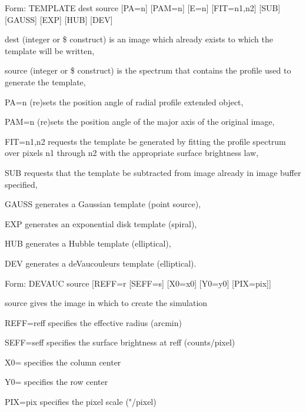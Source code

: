 {\newpage\clearpage
{}%
\begin{command}
  \item[Form: TEMPLATE dest source {[PA=n]} {[PAM=n]} {[E=n]} {[FIT=n1,n2]}
       {[SUB]} {[GAUSS]} {[EXP]} {[HUB]} {[DEV]}\hfill]{}
  \item[dest]{(integer or \$ construct) is an image which already 
       exists to which the template will be written,}
  \item[source]{(integer or \$ construct) is the spectrum that
       contains the profile used to generate the template,}
  \item[PA=n]{(re)sets the position angle of radial profile
       extended object,}
  \item[PAM=n]{(re)sets the position angle of the major axis
       of the original image,}
  \item[FIT=n1,n2]{requests the template be generated by fitting
       the profile spectrum over pixels n1 through n2
       with the appropriate surface brightness law,}
  \item[SUB]{requests that the template be subtracted from
       image already in image buffer specified,}
  \item[GAUSS]{generates a Gaussian template (point source),}
  \item[EXP]{generates an exponential disk template (spiral),}
  \item[HUB]{generates a Hubble template (elliptical),}
  \item[DEV]{generates a deVaucouleurs template (elliptical).}
\end{command}%
\lthtmlfigureZ
\lthtmlcheckvsize\clearpage}

{\newpage\clearpage
{}%
\begin{command}
  \item[Form: DEVAUC source [REFF=r] [SEFF=s] [X0=x0] [Y0=y0] 
       [PIX=pix]\hfill]{}
  \item[source]{gives the image in which to create the simulation}
  \item[REFF=reff]{specifies the effective radius (arcmin)}
  \item[SEFF=seff]{specifies the surface brightness at reff (counts/pixel)}
  \item[X0=]{specifies the column center}
  \item[Y0=]{specifies the row center}
  \item[PIX=pix]{specifies the pixel scale ("/pixel)}
\end{command}%
\lthtmlfigureZ
\lthtmlcheckvsize\clearpage}

